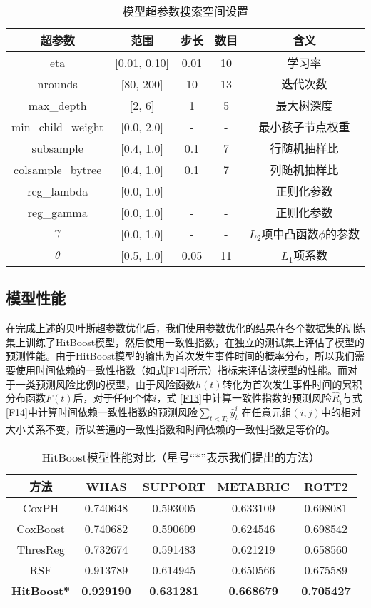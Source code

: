 \begin{table}[H]
\caption{模型超参数搜索空间设置}
\begin{tabular}{ccccc}
\toprule
超参数 & 范围 & 步长 & 数目 & 含义 \\ 
\midrule
eta & [0.01, 0.10] & 0.01 & 10 & 学习率 \\
nrounds & [80, 200] & 10 & 13 & 迭代次数 \\
max\_depth & [2, 6] & 1 & 5 & 最大树深度 \\
min\_child\_weight & [0.0, 2.0] & - & - & 最小孩子节点权重 \\
subsample & [0.4, 1.0] & 0.1 & 7 & 行随机抽样比 \\
colsample\_bytree & [0.4, 1.0] & 0.1 & 7 & 列随机抽样比 \\
reg\_lambda & [0.0, 1.0] & - & - & 正则化参数 \\
reg\_gamma & [0.0, 1.0] & - & - & 正则化参数 \\
$\gamma$ & [0.0, 1.0] & - & - & $L_2$项中凸函数$\phi$的参数 \\
$\theta$ & [0.5, 1.0] & 0.05 & 11 & $L_1$项系数 \\
\bottomrule
\end{tabular}
\label{table03}
\end{table}

\subsection{模型性能}

在完成上述的贝叶斯超参数优化后，我们使用参数优化的结果在各个数据集的训练集上训练了HitBoost模型，然后使用一致性指数，在独立的测试集上评估了模型的预测性能。由于HitBoost模型的输出为首次发生事件时间的概率分布，所以我们需要使用时间依赖的一致性指数（如式\eqref{F14}所示）指标来评估该模型的性能。而对于一类预测风险比例的模型，由于风险函数$h(t)$转化为首次发生事件时间的累积分布函数$F(t)$后，对于任何个体$i$，式 \eqref{F13}中计算一致性指数的预测风险$\hat{R}_i$与式 \eqref{F14}中计算时间依赖一致性指数的预测风险$\sum_{t<T_i} \hat{y}_t^i$ 在任意元组$(i,j)$中的相对大小关系不变，所以普通的一致性指数和时间依赖的一致性指数是等价的。

\begin{table}[h]
\caption{HitBoost模型性能对比（星号“*”表示我们提出的方法）}
\begin{tabular}{ccccc}
\toprule
方法 & WHAS & SUPPORT & METABRIC & ROTT2 \\ 
\midrule
CoxPH & 0.740648 & 0.593005 & 0.633109 & 0.698081 \\
CoxBoost & 0.740682 & 0.590609 & 0.624546 & 0.698542 \\
ThresReg & 0.732674 & 0.591483 & 0.621219 & 0.658560 \\
RSF & 0.913789 & 0.614945 & 0.650566 & 0.675589 \\
\textbf{HitBoost*} & \textbf{0.929190} & \textbf{0.631281} & \textbf{0.668679} & \textbf{0.705427} \\
\bottomrule
\end{tabular}
\label{table04}
\end{table}

